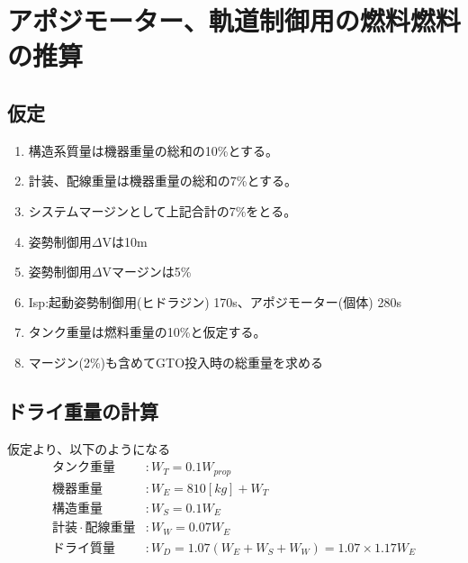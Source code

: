 \section{アポジモーター、軌道制御用の燃料燃料の推算}

\subsection{仮定}
\begin{enumerate}
  \item 構造系質量は機器重量の総和の10\%とする。
  \item 計装、配線重量は機器重量の総和の7\%とする。
  \item システムマージンとして上記合計の7\%をとる。
  \item 姿勢制御用$\Delta$Vは10m
  \item 姿勢制御用$\Delta$Vマージンは5\%
  \item Isp:起動姿勢制御用(ヒドラジン) 170s、アポジモーター(個体) 280s
  \item タンク重量は燃料重量の10\%と仮定する。
  \item マージン(2\%)も含めてGTO投入時の総重量を求める
\end{enumerate}

\subsection{ドライ重量の計算}
 仮定より、以下のようになる
 \begin{align*}
   タンク重量 & : W_T = 0.1W_{prop} \\
   機器重量 & : W_E = 810[kg] + W_T \\
   構造重量 & : W_S = 0.1W_E \\
   計装 \cdot 配線重量 & : W_W = 0.07W_E \\
   ドライ質量 & : W_D = 1.07(W_E + W_S + W_W) = 1.07 \times 1.17 W_E \\
 \end{align*}

